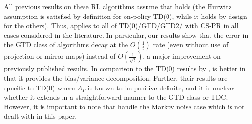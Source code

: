 All previous results on these RL algorithms assume that  holds (the Hurwitz assumption is satisfied by definition for on-policy TD(0), while it holds by design for the others). 
Thus,  applies to all of TD(0)/GTD/GTD2/ with CS-PR in all cases considered in the literature.
In particular, our results show that the error in the GTD class of algorithms decay at the $O(\frac{1}{t})$ rate (even without use of projection or mirror maps) instead of $O(\frac{1}{\sqrt{t}})$, a major improvement on previously published results. In comparison to the TD(0) results by \citet{korda-prashanth},  is better in that it provides the bias/variance decomposition. Further, their results are specific to TD(0) where $A_P$ is known to be positive definite, and it is unclear whether it extends in a straightforward manner to the GTD class or TDC. 
However, it is important to note that \citet{korda-prashanth} handle the Markov noise case which is not dealt with in this paper. 
